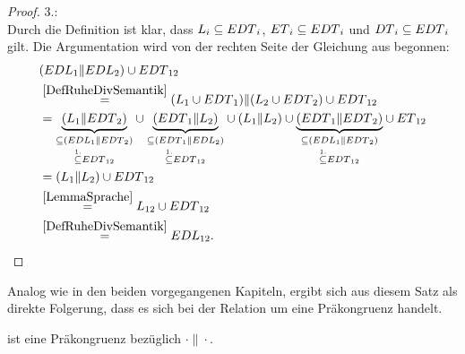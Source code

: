 \begin{proof}
  3.:\\
  Durch die Definition ist klar, dass $L_i\subseteq EDT{}_i$,
  $ET{}_i\subseteq EDT{}_i$ und $DT{}_i\subseteq EDT{}_i$ gilt. Die
  Argumentation wird von der rechten Seite der Gleichung aus begonnen:
  \begin{align*}
    &(EDL{}_1\| EDL{}_2)\cup EDT{}_{12}\\
    &\overset{\ref{DefRuheDivSemantik}}{=}(L_1\cup EDT{}_1)\|(L_2\cup
    EDT{}_2)\cup EDT{}_{12}\\
    &=\underset{\overset{1.}{\subseteq} EDT{}_{12}}{\underset{\subseteq
    (EDL{}_1\|EDT{}_2)}{\underbrace{(L_1\|EDT{}_2)}}} \cup
    \underset{\overset{1.}{\subseteq} EDT{}_{12}}{\underset{\subseteq
    (EDT{}_1\|EDL{}_2)}{\underbrace{(EDT{}_1\|L_2)}}} \cup
    (L_1\|L_2) \cup \underset{\overset{1.}{\subseteq}
    EDT{}_{12}}{\underset{\subseteq
    (EDL{}_1\|EDT{}_2)}{\underbrace{(EDT{}_1\|EDT{}_2)}}} \cup ET{}_{12}\\
    &=(L_1\|L_2) \cup EDT{}_{12}\\
    &\overset{\ref{LemmaSprache}}{=}L_{12}\cup EDT{}_{12}\\
    &\overset{\ref{DefRuheDivSemantik}}{=}EDL{}_{12}.
  \end{align*}
\end{proof}

Analog wie in den beiden vorgegangenen Kapiteln, ergibt sich aus diesem Satz
als direkte Folgerung, dass es sich bei der Relation \DRel{} um eine
Präkongruenz handelt.

\begin{prop}
\label{propDivPrae}
  \DRel{} ist eine Präkongruenz bezüglich $\cdot\|\cdot$.
\end{prop}


